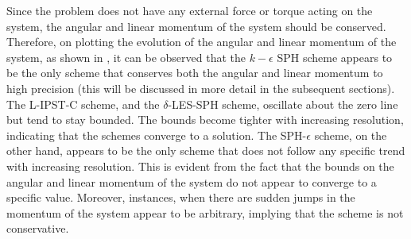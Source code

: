 Since the problem does not have any external force or torque acting on the system, the angular and linear momentum of the system should be conserved.
Therefore, on plotting the evolution of the angular and linear momentum of the system, as shown in , it can be observed that the $k-\epsilon$ SPH scheme appears to be the only scheme that conserves both the angular and linear momentum to high precision (this will be discussed in more detail in the subsequent sections). The L-IPST-C scheme, and the $\delta$-LES-SPH scheme, oscillate about the zero line but tend to stay bounded. The bounds become tighter with increasing resolution, indicating that the schemes converge to a solution.
The SPH-$\epsilon$ scheme, on the other hand, appears to be the only scheme that does not follow any specific trend with increasing resolution. This is evident from the fact that the bounds on the angular and linear momentum of the system do not appear to converge to a specific value. Moreover, instances, when there are sudden jumps in the momentum of the system appear to be arbitrary, implying that the scheme is not conservative.

